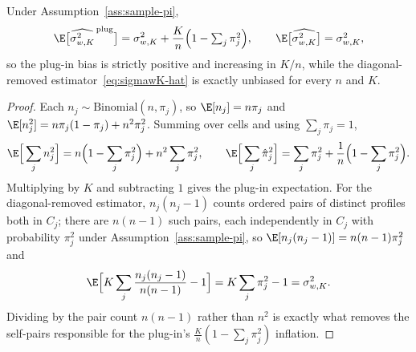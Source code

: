 \begin{lemma}
\label{lem:unbiased}
Under Assumption~\ref{ass:sample-pi},
\[
  \E\big[\widehat{\sigma_{w,K}^2}^{\,\mathrm{plug}}\big]
  =\sigma_{w,K}^2+\frac{K}{n}\Big(1-\textstyle\sum_j\pi_j^2\Big),
  \qquad
  \E\big[\widehat{\sigma_{w,K}^2}\big]=\sigma_{w,K}^2 ,
\]
so the plug-in bias is strictly positive and increasing in $K/n$, while
the diagonal-removed estimator~\eqref{eq:sigmawK-hat} is exactly
unbiased for every $n$ and $K$.
\end{lemma}
\begin{proof}
Each $n_j\sim\mathrm{Binomial}(n,\pi_j)$, so $\E[n_j]=n\pi_j$ and
$\E[n_j^2]=n\pi_j(1-\pi_j)+n^2\pi_j^2$. Summing over cells and using
$\sum_j\pi_j=1$,
\[
  \E\Big[\sum_j n_j^2\Big]=n\Big(1-\sum_j\pi_j^2\Big)+n^2\sum_j\pi_j^2,
  \qquad
  \E\Big[\sum_j\hat\pi_j^2\Big]=\sum_j\pi_j^2+\frac1n\Big(1-\sum_j\pi_j^2\Big).
\]
Multiplying by $K$ and subtracting $1$ gives the plug-in expectation.
For the diagonal-removed estimator, $n_j(n_j-1)$ counts ordered pairs of
distinct profiles both in $C_j$; there are $n(n-1)$ such pairs, each
independently in $C_j$ with probability $\pi_j^2$ under
Assumption~\ref{ass:sample-pi}, so $\E[n_j(n_j-1)]=n(n-1)\pi_j^2$ and
\[
  \E\Big[K\sum_j\frac{n_j(n_j-1)}{n(n-1)}-1\Big]=K\sum_j\pi_j^2-1=\sigma_{w,K}^2 .
\]
Dividing by the pair count $n(n-1)$ rather than $n^2$ is exactly what
removes the self-pairs responsible for the plug-in's
$\tfrac{K}{n}(1-\sum_j\pi_j^2)$ inflation.
\end{proof}

